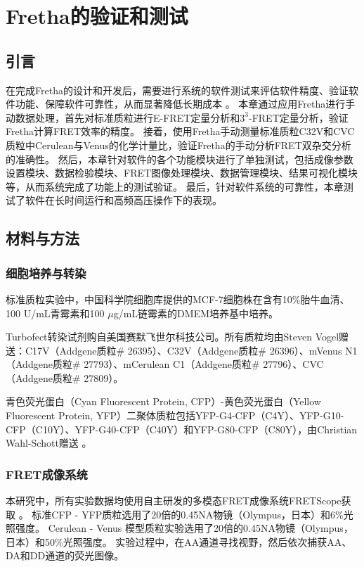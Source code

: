 \chapter{Fretha的验证和测试}

\section{引言}
在完成Fretha的设计和开发后，需要进行系统的软件测试来评估软件精度、验证软件功能、保障软件可靠性，从而显著降低长期成本 。
本章通过应用Fretha进行手动数据处理，首先对标准质粒进行E-FRET定量分析和$3^3$-FRET定量分析，验证Fretha计算FRET效率的精度。
接着，使用Fretha手动测量标准质粒C32V和CVC质粒中Cerulean与Venus的化学计量比，验证Fretha的手动分析FRET双杂交分析的准确性。
然后，本章针对软件的各个功能模块进行了单独测试，包括成像参数设置模块、数据检验模块、FRET图像处理模块、数据管理模块、结果可视化模块等，从而系统完成了功能上的测试验证。
最后，针对软件系统的可靠性，本章测试了软件在长时间运行和高频高压操作下的表现。

\section{材料与方法}
\subsection{细胞培养与转染}
\label{sec:细胞质粒}
标准质粒实验中，中国科学院细胞库提供的MCF-7细胞株在含有10\%胎牛血清、100 U/mL青霉素和100 $\mu$g/mL链霉素的DMEM培养基中培养。

Turbofect\texttrademark{}转染试剂购自美国赛默飞世尔科技公司。所有质粒均由Steven Vogel赠送：C17V（Addgene质粒\# 26395）、C32V（Addgene质粒\# 26396）、mVenus N1（Addgene质粒\# 27793）、mCerulean C1（Addgene质粒\# 27796）、CVC（Addgene质粒\# 27809）。

青色荧光蛋白（Cyan Fluorescent Protein, CFP）-黄色荧光蛋白（Yellow Fluorescent Protein, YFP）二聚体质粒包括YFP-G4-CFP（C4Y）、YFP-G10-CFP（C10Y）、YFP-G40-CFP（C40Y）和YFP-G80-CFP（C80Y），由Christian Wahl-Schott赠送 。

\subsection{FRET成像系统}
\label{sec:成像条件}
本研究中，所有实验数据均使用自主研发的多模态FRET成像系统FRETScope获取 。
标准CFP - YFP质粒选用了20倍的0.45NA物镜（Olympus，日本）和6\%光照强度。
Cerulean - Venus 模型质粒实验选用了20倍的0.45NA物镜（Olympus，日本）和50\%光照强度。
实验过程中，在AA通道寻找视野，然后依次捕获AA、DA和DD通道的荧光图像。

